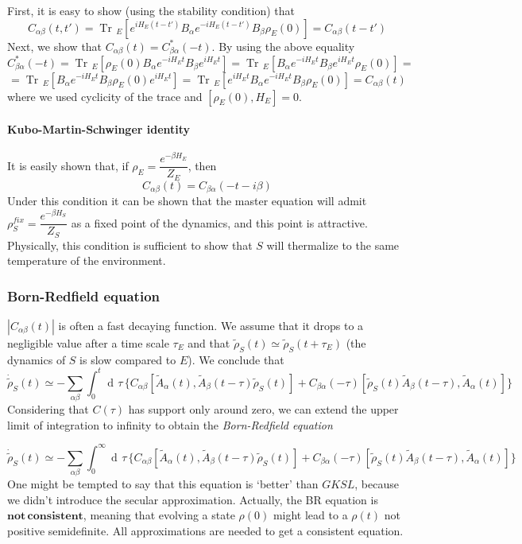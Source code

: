 \documentclass[a4paper, 11pt]{article}
\newcommand{\dd}{\mathop{\mathrm{d}\!}{}}
\newcommand{\Tr}{\mathop{\mathrm{Tr}\!}{}}
\begin{document}
	First, it is easy to show (using the stability condition) that
	\[ C_{\alpha\beta}(t,t') = \Tr_E\left[ e^{iH_E (t-t')} B_\alpha e^{-iH_E(t-t')} B_\beta \rho_E(0) \right] = C_{\alpha\beta}(t-t') \]
	Next, we show that $C_{\alpha\beta}(t) = C_{\beta\alpha}^*(-t)$. By using the above equality
	\[ C_{\beta\alpha}^*(-t) = \Tr_E\left[ \rho_E(0) B_\alpha e^{-iH_Et} B_\beta e^{iH_Et} \right] = \Tr_E\left[ B_\alpha e^{-iH_Et} B_\beta e^{iH_Et} \rho_E(0) \right] = \]
	\[ = \Tr_E\left[ B_\alpha e^{-iH_Et} B_\beta \rho_E(0) e^{iH_Et} \right] = \Tr_E\left[ e^{iH_Et} B_\alpha e^{-iH_Et} B_\beta \rho_E(0) \right] = C_{\alpha\beta}(t) \]
	where we used cyclicity of the trace and $[\rho_E(0), H_E]=0$.
	
	\paragraph{Kubo-Martin-Schwinger identity} It is easily shown that, if $\rho_E = \dfrac{e^{-\beta H_E}}{Z_E}$, then
	\[ C_{\alpha\beta}(t) = C_{\beta\alpha}(-t-i\beta) \]
	Under this condition it can be shown that the master equation will admit $\rho_S^{fix} = \dfrac{e^{-\beta H_S}}{Z_S}$ as a fixed point of the dynamics, and this point is attractive. Physically, this condition is sufficient to show that $S$ will thermalize to the same temperature of the environment.
	
	\subsubsection{Born-Redfield equation} $|C_{\alpha\beta}(t)|$ is often a fast decaying function. We assume that it drops to a negligible value after a time scale $\tau_E$ and that $\tilde{\rho}_S(t) \simeq \tilde{\rho}_S(t+\tau_E)$ (the dynamics of $S$ is slow compared to $E$). We conclude that
	\[ \dot{\tilde{\rho}}_S(t) \simeq - \sum_{\alpha\beta} \int_{0}^{t}\dd \tau\, \{
	C_{\alpha\beta} [\tilde{A}_\alpha(t), \tilde{A}_\beta(t-\tau) \tilde{\rho}_S(t) ] +
	C_{\beta\alpha}(-\tau) [\tilde{\rho}_S(t)\tilde{A}_\beta(t-\tau), \tilde{A}_\alpha(t)] \} \]
	Considering that $C(\tau)$ has support only around zero, we can extend the upper limit of integration to infinity to obtain the \emph{Born-Redfield equation}
	
	\[ \dot{\tilde{\rho}}_S(t) \simeq - \sum_{\alpha\beta} \int_{0}^{\infty}\dd \tau\, \{
	C_{\alpha\beta} [\tilde{A}_\alpha(t), \tilde{A}_\beta(t-\tau) \tilde{\rho}_S(t) ] +
	C_{\beta\alpha}(-\tau) [\tilde{\rho}_S(t)\tilde{A}_\beta(t-\tau), \tilde{A}_\alpha(t)] \} \]
	One might be tempted to say that this equation is `better' than $GKSL$, because we didn't introduce the secular approximation. Actually, the BR equation is $\mathbf{not\, consistent}$, meaning that evolving a state $\rho(0)$ might lead to a $\rho(t)$ not positive semidefinite.
	All approximations are needed to get a consistent equation.
	
\end{document}
